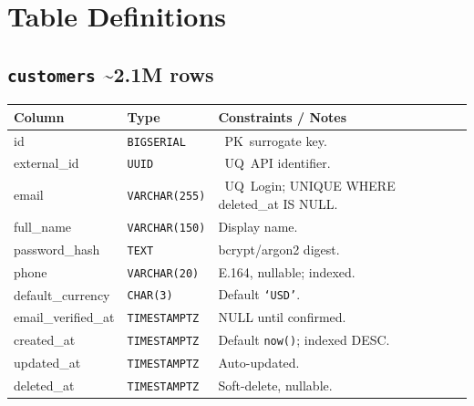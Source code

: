 \documentclass[8pt,a4paper]{extarticle}
\newcommand{\pkbadge}{\textcolor{primary}{\faKey}~PK}
\newcommand{\uqbadge}{\textcolor{accent}{\faPen}~UQ}
\newcommand{\tttype}[1]{\texttt{#1}}
\newcommand{\tableheader}[2]{\subsection{\texttt{#1} \textcolor{accent}{\textbar{} #2}}}
\begin{document}
\section{Table Definitions}

\tableheader{customers}{\textasciitilde{}2.1M rows}
\begin{tcolorbox}[schemaframe]
  \renewcommand{\arraystretch}{1.05}
  \begin{tabularx}{\linewidth}{p{2cm} p{1.6cm} X p{2cm}}
    \toprule
    \rowcolor{primary!10}\textbf{Column} & \textbf{Type} & \textbf{Constraints / Notes} \\
    \midrule
    id              & \tttype{BIGSERIAL}   & \pkbadge\ surrogate key. \\
    external\_id    & \tttype{UUID}        & \uqbadge\ API identifier. \\
    email           & \tttype{VARCHAR(255)}& \uqbadge\ Login; UNIQUE WHERE deleted\_at IS NULL. \\
    full\_name      & \tttype{VARCHAR(150)}& Display name. \\
    password\_hash  & \tttype{TEXT}        & bcrypt/argon2 digest. \\
    phone           & \tttype{VARCHAR(20)} & E.164, nullable; indexed. \\
    default\_currency& \tttype{CHAR(3)}    & Default \texttt{`USD'}. \\
    email\_verified\_at&\tttype{TIMESTAMPTZ}&NULL until confirmed. \\
    created\_at     & \tttype{TIMESTAMPTZ} & Default \texttt{now()}; indexed DESC. \\
    updated\_at     & \tttype{TIMESTAMPTZ} & Auto-updated. \\
    deleted\_at     & \tttype{TIMESTAMPTZ} & Soft-delete, nullable. \\
    \bottomrule
  \end{tabularx}
\end{tcolorbox}
\end{document}
